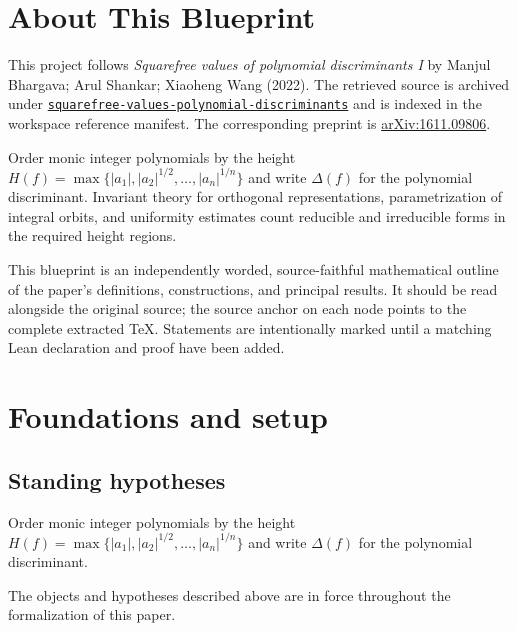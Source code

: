 

\chapter*{About This Blueprint}
\label{squarefree-values-polynomial-discriminants-about}

This project follows \emph{Squarefree values of polynomial discriminants I} by Manjul Bhargava; Arul Shankar; Xiaoheng Wang (2022). The
retrieved source is archived under
\href{../../../../../references/squarefree-values-polynomial-discriminants/}{\texttt{squarefree-values-polynomial-discriminants}} and is indexed in
the workspace reference manifest. The corresponding preprint is
\href{https://arxiv.org/abs/1611.09806}{arXiv:1611.09806}.

Order monic integer polynomials by the height $H(f)=\max\{|a_1|,|a_2|^{1/2},\ldots,|a_n|^{1/n}\}$ and write $\Delta(f)$ for the polynomial discriminant. Invariant theory for orthogonal representations, parametrization of integral orbits, and uniformity estimates count reducible and irreducible forms in the required height regions.

This blueprint is an independently worded, source-faithful mathematical
outline of the paper's definitions, constructions, and principal results. It
should be read alongside the original source; the source anchor on each node
points to the complete extracted TeX. Statements are intentionally marked
\notready until a matching Lean declaration and proof have been added.

\chapter{Foundations and setup}
\label{chap:squarefree-values-polynomial-discriminants-foundations}

\section{Standing hypotheses}
\label{sec:squarefree-values-polynomial-discriminants-standing}

Order monic integer polynomials by the height $H(f)=\max\{|a_1|,|a_2|^{1/2},\ldots,|a_n|^{1/n}\}$ and write $\Delta(f)$ for the polynomial discriminant.

\begin{convention}
\label{squarefree-values-polynomial-discriminants-setup}
The objects and hypotheses described above are in force throughout the
formalization of this paper.
\notready
\end{convention}

